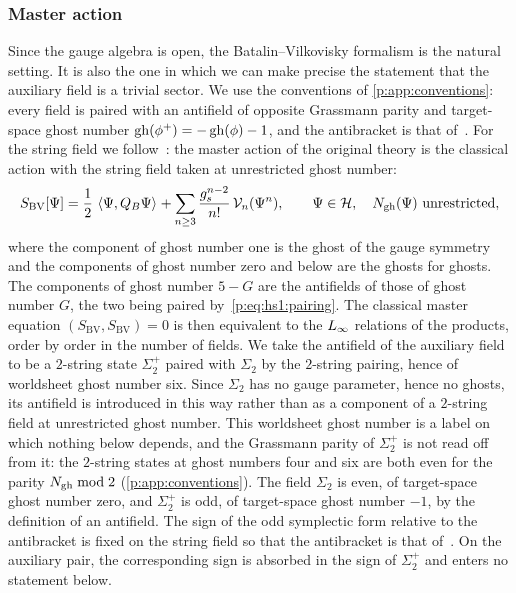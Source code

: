 \subsubsection{Master action}
\label{p:sec:gauge:master-action}

Since the gauge algebra is open, the Batalin--Vilkovisky formalism is the natural setting.
  It is also the one in which we can make precise the statement that the auxiliary field is a trivial sector.
We use the conventions of \cref{p:app:conventions}: every field is paired with an antifield of opposite Grassmann parity and target-space ghost number $\operatorname{gh}(\phi^+) = - \operatorname{gh}(\phi) - 1$, and the antibracket is that of~\cite[ch.~15]{Henneaux:1994:QuantizationGaugeSystems}.
For the string field we follow~\cite{Zwiebach:1993:ClosedStringField}: the master action of the original theory is the classical action with the string field taken at unrestricted ghost number:
\begin{equation}
  \label{p:eq:gauge:master-original}
  S_{\mathrm{BV}}[\Psi]
    = \frac{1}{2} \, \braket{\Psi, Q_B \Psi}_{}
      + \sum_{n \ge 3} \frac{g_s^{n-2}}{n!} \, \mathcal{V}_{n}(\Psi^n),
  \qquad
  \Psi \in \mathcal{H},
  \quad
  N_{\text{gh}}(\Psi) \text{ unrestricted},
\end{equation}
where the component of ghost number one is the ghost of the gauge symmetry and the components of ghost number zero and below are the ghosts for ghosts.
The components of ghost number $5 - G$ are the antifields of those of ghost number $G$, the two being paired by~\eqref{p:eq:hs1:pairing}.
The classical master equation $(S_{\mathrm{BV}}, S_{\mathrm{BV}}) = 0$ is then equivalent to the $L_\infty$ relations of the products, order by order in the number of fields.
We take the antifield of the auxiliary field to be a $2$-string state $\Sigma_2^+$ paired with $\Sigma_2$ by the $2$-string pairing, hence of worldsheet ghost number six.
Since $\Sigma_2$ has no gauge parameter, hence no ghosts, its antifield is introduced in this way rather than as a component of a $2$-string field at unrestricted ghost number.
  This worldsheet ghost number is a label on which nothing below depends, and the Grassmann parity of $\Sigma_2^+$ is not read off from it: the $2$-string states at ghost numbers four and six are both even for the parity $N_{\text{gh}} \bmod 2$ (\cref{p:app:conventions}).
The field $\Sigma_2$ is even, of target-space ghost number zero, and $\Sigma_2^+$ is odd, of target-space ghost number $-1$, by the definition of an antifield.
The sign of the odd symplectic form relative to the antibracket is fixed on the string field so that the antibracket is that of~\cite[eq.~(3.26)]{Zwiebach:1993:ClosedStringField}.
On the auxiliary pair, the corresponding sign is absorbed in the sign of $\Sigma_2^+$ and enters no statement below.


